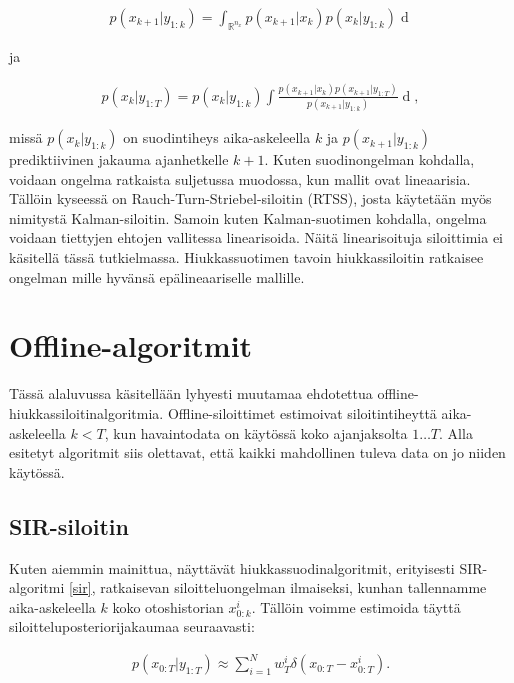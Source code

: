 \documentclass[
  12pt,
  a4paper, twoside]{book}
\begin{document}
\begin{align}\label{siloitin-prediktiivinen}
p(x_{k+1}|y_{1:k})=\int_{\mathbb{R}^{n_x}}p(x_{k+1}|x_k)p(x_k|y_{1:k})\mathop{dx_k}
\end{align}

ja

\begin{align}\label{siloitin-ratkaisu}
p(x_k|y_{1:T}) = p(x_k|y_{1:k}) \int \frac{p(x_{k+1}|x_k)p(x_{k+1}|y_{1:T})}{p(x_{k+1}|y_{1:k})} \mathop{dx_{k+1}},
\end{align}

\noindent missä \(p(x_k|y_{1:k})\) on suodintiheys aika-askeleella \(k\) ja \(p(x_{k+1}|y_{1:k})\) prediktiivinen jakauma ajanhetkelle \(k+1\). Kuten suodinongelman kohdalla, voidaan ongelma ratkaista suljetussa muodossa, kun mallit ovat lineaarisia. Tällöin kyseessä on Rauch-Turn-Striebel-siloitin (RTSS), josta käytetään myös nimitystä Kalman-siloitin. Samoin kuten Kalman-suotimen kohdalla, ongelma voidaan tiettyjen ehtojen vallitessa linearisoida. Näitä linearisoituja siloittimia ei käsitellä tässä tutkielmassa. Hiukkassuotimen tavoin hiukkassiloitin ratkaisee ongelman mille hyvänsä epälineaariselle mallille.

\section{Offline-algoritmit}

Tässä alaluvussa käsitellään lyhyesti muutamaa ehdotettua offline-hiukkassiloitinalgoritmia. Offline-siloittimet estimoivat siloitintiheyttä aika-askeleella \(k<T\), kun havaintodata on käytössä koko ajanjaksolta \(1 \ldots T\). Alla esitetyt algoritmit siis olettavat, että kaikki mahdollinen tuleva data on jo niiden käytössä.

\subsection{SIR-siloitin}

Kuten aiemmin mainittua, näyttävät hiukkassuodinalgoritmit, erityisesti SIR-algoritmi \ref{sir}, ratkaisevan siloitteluongelman ilmaiseksi, kunhan tallennamme aika-askeleella \(k\) koko otoshistorian \(x_{0:k}^i\). Tällöin voimme estimoida täyttä siloitteluposteriorijakaumaa seuraavasti:

\begin{align}\label{siloitin-posteriori}
p(x_{0:T}|y_{1:T}) \approx \sum_{i=1}^N w_T^i \delta (x_{0:T}-x_{0:T}^i).
\end{align}
\end{document}
